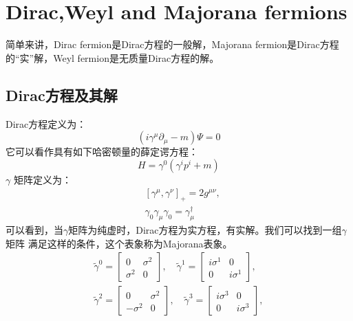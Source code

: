 \documentclass[10pt,openany]{book}
\theoremstyle{thmstyle} %
\theoremstyle{defstyle} %
\theoremstyle{prostyle} %
\begin{document}
\section{Dirac,Weyl and Majorana fermions}\cite{pal2011dirac}
简单来讲，Dirac fermion是Dirac方程的一般解，Majorana fermion是Dirac方程的“实”解，Weyl fermion是无质量Dirac方程的解。\\
\subsection{Dirac方程及其解}
Dirac方程定义为：
\begin{equation}
  \left(i \gamma^\mu \partial_\mu-m\right) \Psi=0\label{de}
\end{equation}
它可以看作具有如下哈密顿量的薛定谔方程：
\begin{equation}
  H=\gamma^0\left(\gamma^i p^i+m\right)
\end{equation}
$\gamma$ 矩阵定义为：
\begin{equation}
  \begin{aligned}
    & {\left[\gamma^\mu, \gamma^\nu\right]_{+}=2 g^{\mu \nu},} \\
    & \gamma_0 \gamma_\mu \gamma_0=\gamma_\mu^{\dagger}
    \end{aligned}
\end{equation}
可以看到，当$ \gamma $矩阵为纯虚时，Dirac方程为实方程，有实解。我们可以找到一组$ \gamma $矩阵 满足这样的条件，这个表象称为Majorana表象。
\begin{equation}
  \begin{array}{ll}
    \widetilde{\gamma}^0=\left[\begin{array}{cc}
    0 & \sigma^2 \\
    \sigma^2 & 0
    \end{array}\right], \quad \widetilde{\gamma}^1=\left[\begin{array}{cc}
    i \sigma^1 & 0 \\
    0 & i \sigma^1
    \end{array}\right], \\
    \tilde{\gamma}^2=\left[\begin{array}{cc}
    0 & \sigma^2 \\
    -\sigma^2 & 0
    \end{array}\right], \quad \tilde{\gamma}^3=\left[\begin{array}{cc}
    i \sigma^3 & 0 \\
    0 & i \sigma^3
    \end{array}\right],
    \end{array}
\end{equation}
\end{document}
